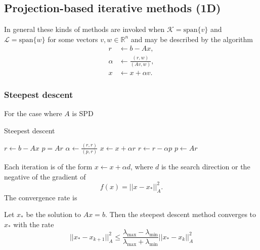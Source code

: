 \subsection{Projection-based iterative methods (1D)}
In general these kinds of methods are invoked when $\mathcal{K} = \text{span}\{v\}$ and $\mathcal{L} = \text{span}\{w\}$ for some vectors $v, w \in \mathbb{R}^n$ and may be described by the algorithm
\begin{align*}
    r      & \leftarrow b - Ax,                 \\
    \alpha & \leftarrow \frac{(r, w)}{(Av, w)}, \\
    x      & \leftarrow x + \alpha v.
\end{align*}

\subsubsection{Steepest descent}
For the case where $A$ is SPD 
\begin{algorithm}[H]
    \caption{Steepest descent \cite[Algorithm 5.2]{iter_method_saad}}
    \begin{algorithmic}
        \State $r \leftarrow b - Ax$
        \State $p = Ar$
        \State $\alpha \leftarrow \frac{(r, r)}{(p, r)}$
        \State $x \leftarrow x + \alpha r$
        \State $r \leftarrow r - \alpha p$
        \State $p \leftarrow Ar$
        \EndWhile
    \end{algorithmic}
\end{algorithm}
Each iteration is of the form $x \leftarrow x + \alpha d$, where $d$ is the search direction or the negative of the gradient of
\[
    f(x) = ||x - x_*||_A^2.
\]
The convergence rate is \cite[Theorem 5.9]{iter_method_saad}
\begin{theorem}
    Let $x_*$ be the solution to $Ax = b$. Then the steepest descent method converges to $x_*$ with the rate
    \begin{equation}
        ||x_* - x_{k+1}||_A^2 \leq \frac{\lambda_{\text{max}} - \lambda_{\text{min}}}{\lambda_{\text{max}} + \lambda_{\text{min}}} ||x_* - x_k||_A^2
        \label{eq:steepest_descent_convergence}
    \end{equation}
    \label{th:steepest_descent_convergence}
\end{theorem}

